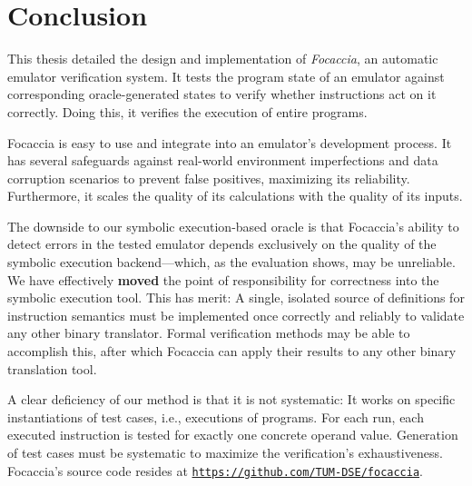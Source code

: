 \chapter{Conclusion}

This thesis detailed the design and implementation of \textit{Focaccia}, an automatic emulator verification system. It
tests the program state of an emulator against corresponding oracle-generated states to verify whether instructions act
on it correctly. Doing this, it verifies the execution of entire programs.

Focaccia is easy to use and integrate into an emulator's development process. It has several safeguards against
real-world environment imperfections and data corruption scenarios to prevent false positives, maximizing its
reliability. Furthermore, it scales the quality of its calculations with the quality of its inputs.

The downside to our symbolic execution-based oracle is that Focaccia's ability to detect errors in the tested emulator
depends exclusively on the quality of the symbolic execution backend---which, as the evaluation shows, may be
unreliable. We have effectively \textbf{moved} the point of responsibility for correctness into the symbolic execution
tool. This has merit: A single, isolated source of definitions for instruction semantics must be implemented once
correctly and reliably to validate any other binary translator. Formal verification methods may be able to accomplish
this, after which Focaccia can apply their results to any other binary translation tool.

A clear deficiency of our method is that it is not systematic: It works on specific instantiations of test cases, i.e.,
executions of programs. For each run, each executed instruction is tested for exactly one concrete operand value.
Generation of test cases must be systematic to maximize the verification's exhaustiveness.
\\

Focaccia's source code resides at
\href{https://github.com/TUM-DSE/focaccia}{\texttt{https://github.com/TUM-DSE/focaccia}}.
